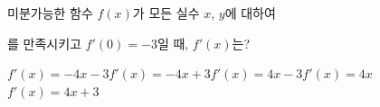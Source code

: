 미분가능한 함수 $f(x)$가 모든 실수 $x$, $y$에 대하여\par\smallskip{}\par\smallskip\noindent 를 만족시키고 $f'(0)=-3$일 때, $f'(x)$는?
\begin{choicesii}{$f'(x)=-4x-3$}{$f'(x)=-4x+3$}{$f'(x)=4x-3$}{$f'(x)=4x$}{$f'(x)=4x+3$}\end{choicesii}
